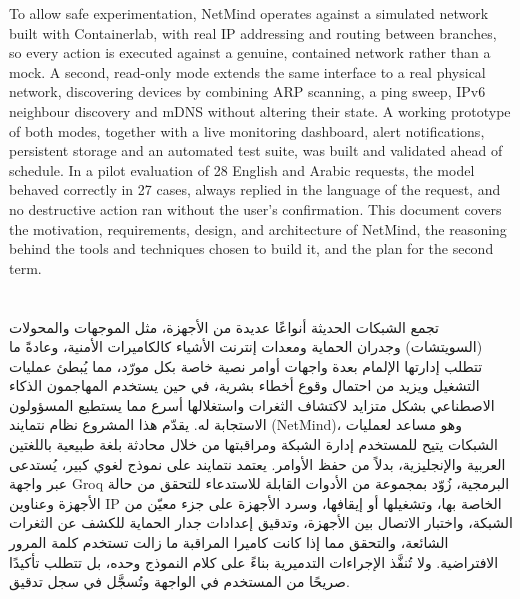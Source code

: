 To allow safe experimentation, NetMind operates against a simulated network
built with Containerlab, with real IP addressing and routing between
branches, so every action is executed against a genuine, contained network
rather than a mock. A second, read-only mode extends the same interface to a
real physical network, discovering devices by combining ARP scanning, a ping
sweep, IPv6 neighbour discovery and mDNS without altering their state. A
working prototype of both modes, together with a live monitoring dashboard,
alert notifications, persistent storage and an automated test suite, was
built and validated ahead of schedule. In a pilot evaluation of 28 English and
Arabic requests, the model behaved correctly in 27 cases, always replied in
the language of the request, and no destructive action ran without the
user's confirmation. This document covers the motivation,
requirements, design, and architecture of NetMind, the reasoning behind the
tools and techniques chosen to build it, and the plan for the second term.

\chapter*{\hfill{}}

\begin{center}
\end{center}

\begin{arabicpar}
تجمع الشبكات الحديثة أنواعًا عديدة من الأجهزة، مثل الموجهات والمحولات
(السويتشات) وجدران الحماية ومعدات إنترنت الأشياء كالكاميرات الأمنية،
وعادةً ما تتطلب إدارتها الإلمام بعدة واجهات أوامر نصية خاصة بكل مورّد، مما
يُبطئ عمليات التشغيل ويزيد من احتمال وقوع أخطاء بشرية، في حين يستخدم
المهاجمون الذكاء الاصطناعي بشكل متزايد لاكتشاف الثغرات واستغلالها أسرع مما
يستطيع المسؤولون الاستجابة له. يقدّم هذا المشروع
نظام نتمايند (NetMind)، وهو مساعد لعمليات الشبكات يتيح للمستخدم إدارة
الشبكة ومراقبتها من خلال محادثة بلغة طبيعية باللغتين العربية والإنجليزية،
بدلاً من حفظ الأوامر. يعتمد نتمايند على نموذج لغوي كبير، يُستدعى عبر واجهة
Groq البرمجية، زُوّد بمجموعة من الأدوات القابلة للاستدعاء للتحقق من حالة
الأجهزة وعناوين IP الخاصة بها، وتشغيلها أو إيقافها، وسرد الأجهزة على جزء
معيّن من الشبكة، واختبار الاتصال بين الأجهزة، وتدقيق إعدادات جدار الحماية
للكشف عن الثغرات الشائعة، والتحقق مما إذا كانت كاميرا المراقبة ما زالت
تستخدم كلمة المرور الافتراضية. ولا تُنفَّذ الإجراءات التدميرية بناءً على
كلام النموذج وحده، بل تتطلب تأكيدًا صريحًا من المستخدم في الواجهة وتُسجَّل
في سجل تدقيق.
\end{arabicpar}

